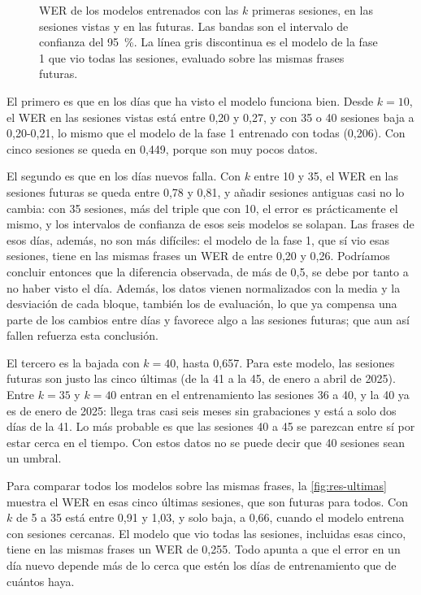 \begin{figure}[htbp]
  \centering
  \caption[WER de los modelos entrenados con las $k$ primeras sesiones, en las sesiones vistas y en las futuras]{WER de los modelos entrenados con las $k$ primeras sesiones, en las sesiones vistas y en las futuras. Las bandas son el intervalo de confianza del 95~\%. La línea gris discontinua es el modelo de la fase 1 que vio todas las sesiones, evaluado sobre las mismas frases futuras.}
  \label{fig:res-cronologico}
\end{figure}

El primero es que en los días que ha visto el modelo funciona bien. Desde $k = 10$, el WER en las sesiones vistas está entre 0,20 y 0,27, y con 35 o 40 sesiones baja a 0,20-0,21, lo mismo que el modelo de la fase 1 entrenado con todas (0,206). Con cinco sesiones se queda en 0,449, porque son muy pocos datos.

El segundo es que en los días nuevos falla. Con $k$ entre 10 y 35, el WER en las sesiones futuras se queda entre 0,78 y 0,81, y añadir sesiones antiguas casi no lo cambia: con 35 sesiones, más del triple que con 10, el error es prácticamente el mismo, y los intervalos de confianza de esos seis modelos se solapan. Las frases de esos días, además, no son más difíciles: el modelo de la fase 1, que sí vio esas sesiones, tiene en las mismas frases un WER de entre 0,20 y 0,26. Podríamos concluir entonces que la diferencia observada, de más de 0,5, se debe por tanto a no haber visto el día. Además, los datos vienen normalizados con la media y la desviación de cada bloque, también los de evaluación, lo que ya compensa una parte de los cambios entre días y favorece algo a las sesiones futuras; que aun así fallen refuerza esta conclusión.

El tercero es la bajada con $k = 40$, hasta 0,657. Para este modelo, las sesiones futuras son justo las cinco últimas (de la 41 a la 45, de enero a abril de 2025). Entre $k = 35$ y $k = 40$ entran en el entrenamiento las sesiones 36 a 40, y la 40 ya es de enero de 2025: llega tras casi seis meses sin grabaciones y está a solo dos días de la 41. Lo más probable es que las sesiones 40 a 45 se parezcan entre sí por estar cerca en el tiempo. Con estos datos no se puede decir que 40 sesiones sean un umbral.

Para comparar todos los modelos sobre las mismas frases, la \cref{fig:res-ultimas} muestra el WER en esas cinco últimas sesiones, que son futuras para todos. Con $k$ de 5 a 35 está entre 0,91 y 1,03, y solo baja, a 0,66, cuando el modelo entrena con sesiones cercanas. El modelo que vio todas las sesiones, incluidas esas cinco, tiene en las mismas frases un WER de 0,255. Todo apunta a que el error en un día nuevo depende más de lo cerca que estén los días de entrenamiento que de cuántos haya.

